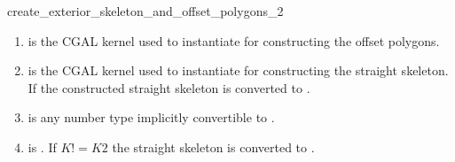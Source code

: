 \begin{ccRefFunction}{create_exterior_skeleton_and_offset_polygons_2}
\ccRequirements

\begin{enumerate}  
   \item    {} is the CGAL kernel used to instantiate
                             for constructing 
                            the offset polygons.
   \item    {} is the CGAL kernel used to instantiate
                             for constructing 
                            the straight skeleton.
                            If  the constructed straight skeleton
                            is converted to .
   \item    {} is any number type implicitly convertible to .
   \item    {} is . 
            If $K != K2$ the straight skeleton is converted to .
\end{enumerate}

\ccSeeAlso
{}\\
 \\

\end{ccRefFunction}



